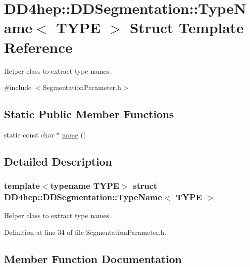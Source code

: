 \hypertarget{struct_d_d4hep_1_1_d_d_segmentation_1_1_type_name}{}\section{D\+D4hep\+:\+:D\+D\+Segmentation\+:\+:Type\+Name$<$ T\+Y\+PE $>$ Struct Template Reference}
\label{struct_d_d4hep_1_1_d_d_segmentation_1_1_type_name}


Helper class to extract type names.  




{\ttfamily \#include $<$Segmentation\+Parameter.\+h$>$}

\subsection*{Static Public Member Functions}
\begin{DoxyCompactItemize}
\item 
static const char $\ast$ \hyperlink{struct_d_d4hep_1_1_d_d_segmentation_1_1_type_name_a3156caa4f8240de7d49d7388ea1545c3}{name} ()
\end{DoxyCompactItemize}


\subsection{Detailed Description}
\subsubsection*{template$<$typename T\+Y\+PE$>$\newline
struct D\+D4hep\+::\+D\+D\+Segmentation\+::\+Type\+Name$<$ T\+Y\+P\+E $>$}

Helper class to extract type names. 

Definition at line 34 of file Segmentation\+Parameter.\+h.



\subsection{Member Function Documentation}
\hypertarget{struct_d_d4hep_1_1_d_d_segmentation_1_1_type_name_a3156caa4f8240de7d49d7388ea1545c3}{}\label{struct_d_d4hep_1_1_d_d_segmentation_1_1_type_name_a3156caa4f8240de7d49d7388ea1545c3} 

